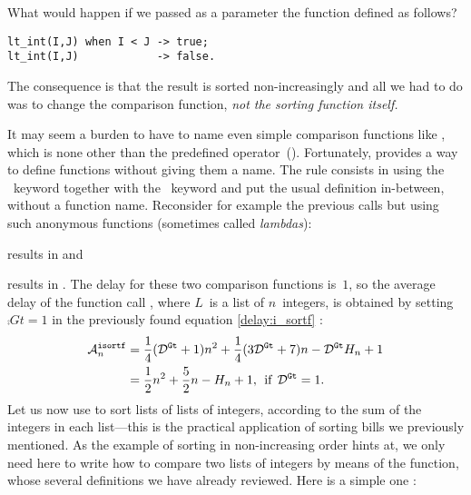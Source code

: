 What would happen if we passed as a parameter the function
 defined as follows?
\begin{verbatim}
lt_int(I,J) when I < J -> true;
lt_int(I,J)            -> false.
\end{verbatim}
The consequence is that the result is sorted non\hyp{}increasingly and
all we had to do was to change the comparison function, \emph{not the
  sorting function itself.}

It may seem a burden to have to name even simple comparison functions
like , which is none other than the predefined
operator~(\erlcode{<}). Fortunately, \Erlang provides a way to define
functions without giving them a name. The rule consists in using the
~keyword together with the ~keyword and put
the usual definition in\hyp{}between, without a function
name. Reconsider for example the previous calls but using such
anonymous functions (sometimes called \emph{lambdas}):
\begin{center}
\end{center}
results in \erlcode{[1,2,3,4,5]} and
\begin{center}
\end{center}
results in \erlcode{[5,4,3,2,1]}. The delay for these two comparison
functions is~\(1\), so the average delay of the function call
, where \(L\)~is a list
of \(n\)~integers, is obtained by setting \(\comp{Gt}{} = 1\) in the
previously found equation \eqref{delay:i_sortf}
:
\begin{align*}
\ave{isortf}{n} 
  &= \frac{1}{4}{(\comp{Gt}{} + 1)n^2}
     + \frac{1}{4}{(3\comp{Gt}{}+7)n} - \comp{Gt}{} H_n + 1\\
  &= \frac{1}{2}{n^2} + \frac{5}{2}{n} - H_n + 1,\,\; \text{if} \,\;
     \comp{Gt}{} = 1.
\end{align*}
Let us now use  to sort lists of lists of
integers, according to the sum of the integers in each list---this is
the practical application of sorting bills we previously mentioned. As
the example of sorting in non\hyp{}increasing order hints at, we only
need here to write how to compare two lists of integers by means of
the  function, whose several definitions we have
already reviewed. Here is a simple one
:\label{code:sum_tf_repeated}

